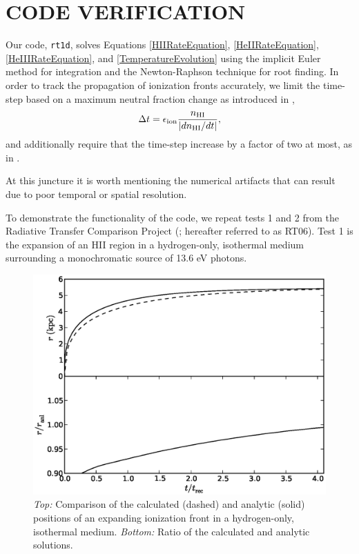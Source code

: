 \documentclass[preprint2]{aastex}              %
\begin{document}
\section{CODE VERIFICATION}
Our code, \texttt{rt1d}, solves Equations \ref{HIIRateEquation}, \ref{HeIIRateEquation}, \ref{HeIIIRateEquation}, and \ref{TemperatureEvolution} using the implicit Euler method for integration and the Newton-Raphson technique for root finding.  In order to track the propagation of ionization fronts accurately, we limit the time-step based on a maximum neutral fraction change as introduced in \cite{Shapiro2004},
\begin{equation}
    \Delta t = \epsilon_{\mathrm{ion}} \frac{n_{\text{HI}}}{|dn_{\text{HI}}/dt|} ,
\end{equation}
and additionally require that the time-step increase by a factor of two at most, as in \cite{Wise2011}.

At this juncture it is worth mentioning the numerical artifacts that can result due to poor temporal or spatial resolution.  

To demonstrate the functionality of the code, we repeat tests 1 and 2 from the Radiative Transfer Comparison Project (\cite{Iliev2006}; hereafter referred to as RT06).  Test 1 is the expansion of an HII region in a hydrogen-only, isothermal medium surrounding a monochromatic source of 13.6 eV photons.  

\begin{figure}[htbp]
\begin{center}
\includegraphics[scale=0.4]{figures/RT_Test1_IfrontEvolution.ps}
\vspace{-20pt}
\caption{\textit{Top:} Comparison of the calculated (dashed) and analytic (solid) positions of an expanding ionization front in a hydrogen-only, isothermal medium. \textit{Bottom:} Ratio of the calculated and analytic solutions.}
\label{fig:RT_Test1_IfrontEvolution}
\end{center}
\end{figure}
\end{document}

